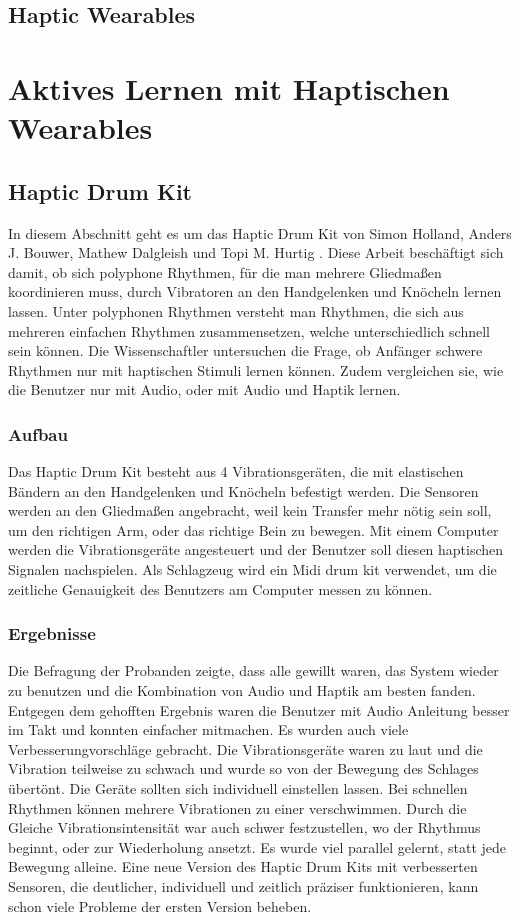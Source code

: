 \documentclass[ngerman,runningheads,a4paper]{llncs}
\begin{document}
\subsection{Haptic Wearables}


\section{Aktives Lernen mit Haptischen Wearables}

\subsection{Haptic Drum Kit}
In diesem Abschnitt geht es um das Haptic Drum Kit von Simon Holland, Anders J. Bouwer, Mathew Dalgleish und Topi M. Hurtig \cite{10.1145/1709886.1709892}
.
Diese Arbeit beschäftigt sich damit, ob sich polyphone Rhythmen, für die man mehrere Gliedmaßen koordinieren muss, durch Vibratoren an den Handgelenken und Knöcheln lernen lassen.
Unter polyphonen Rhythmen versteht man Rhythmen, die sich aus mehreren einfachen Rhythmen zusammensetzen, welche unterschiedlich schnell sein können.
Die Wissenschaftler untersuchen die Frage, ob Anfänger schwere Rhythmen nur mit haptischen Stimuli lernen können.
Zudem vergleichen sie, wie die Benutzer nur mit Audio, oder mit Audio und Haptik lernen.

\subsubsection{Aufbau}
Das Haptic Drum Kit besteht aus 4 Vibrationsgeräten, die mit elastischen Bändern an den Handgelenken und Knöcheln befestigt werden.
Die Sensoren werden an den Gliedmaßen angebracht, weil kein Transfer mehr nötig sein soll, um den richtigen Arm, oder das richtige Bein zu bewegen.
Mit einem Computer werden die Vibrationsgeräte angesteuert und der Benutzer soll diesen haptischen Signalen nachspielen.
Als Schlagzeug wird ein Midi drum kit verwendet, um die zeitliche Genauigkeit des Benutzers am Computer messen zu können.

\subsubsection{Ergebnisse}
Die Befragung der Probanden zeigte, dass alle gewillt waren, das System wieder zu benutzen und die Kombination von Audio und Haptik am besten fanden.
Entgegen dem gehofften Ergebnis waren die Benutzer mit Audio Anleitung besser im Takt und konnten einfacher mitmachen.
Es wurden auch viele Verbesserungvorschläge gebracht.
Die Vibrationsgeräte waren zu laut und die Vibration teilweise zu schwach und wurde so von der Bewegung des Schlages übertönt.
Die Geräte sollten sich individuell einstellen lassen.
Bei schnellen Rhythmen können mehrere Vibrationen zu einer verschwimmen.
Durch die Gleiche Vibrationsintensität war auch schwer festzustellen, wo der Rhythmus beginnt, oder zur Wiederholung ansetzt.
Es wurde viel parallel gelernt, statt jede Bewegung alleine.
Eine neue Version des Haptic Drum Kits mit verbesserten Sensoren, die deutlicher, individuell und zeitlich präziser funktionieren, kann schon viele Probleme der ersten Version beheben.
\end{document}
